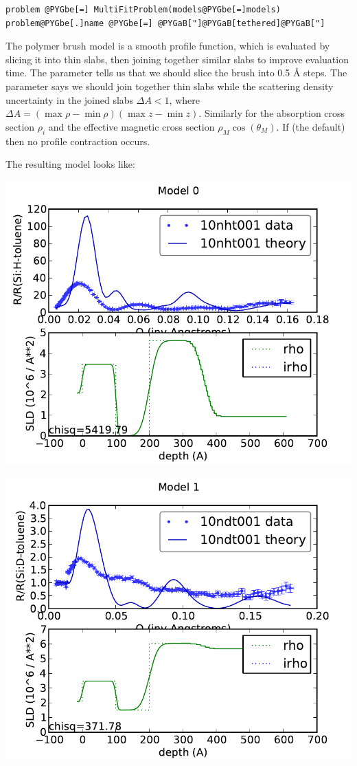 \documentclass[letterpaper,10pt,english]{sphinxmanual}
\begin{document}
\begin{Verbatim}[commandchars=@\[\]]
problem @PYGbe[=] MultiFitProblem(models@PYGbe[=]models)
problem@PYGbe[.]name @PYGbe[=] @PYGaB["]@PYGaB[tethered]@PYGaB["]
\end{Verbatim}

The polymer brush model is a smooth profile function, which is evaluated
by slicing it into thin slabs, then joining together similar slabs to
improve evaluation time.  The  parameter tells us that we
should slice the brush into 0.5 Å steps.  The  parameter
says we should join together thin slabs while the scattering density
uncertainty in the joined slabs $\Delta A < 1$, where
$\Delta A = (\max\rho - \min\rho)(\max z - \min z)$.  Similarly for
the absorption cross section $\rho_i$ and the effective magnetic cross
section $\rho_M \cos(\theta_M)$.  If  (the default) then no
profile contraction occurs.

The resulting model looks like:

\includegraphics{0808430085_00.pdf}

\includegraphics{0808430085_01.pdf}
\end{document}
